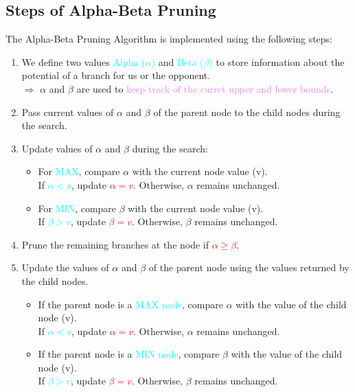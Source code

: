 \documentclass{book}
\begin{document}
\subsection{Steps of Alpha-Beta Pruning}
The Alpha-Beta Pruning Algorithm is implemented using the following steps:
\begin{enumerate}
    \item We define two values \textcolor{cyan}{Alpha ($\alpha$)} and \textcolor{cyan}{Beta ($\beta$)} to store information about the potential of a branch for us or the opponent.\\
    $\Rightarrow$ $\alpha$ and $\beta$ are used to \textcolor{violet}{keep track of the curret upper and lower bounds}.
    \item Pass current values of $\alpha$ and $\beta$ of the parent node to the child nodes during the search.
    \item Update values of $\alpha$ and $\beta$ during the search:
    \begin{itemize}
        \item For \textcolor{cyan}{MAX}, compare $\alpha$ with the current node value (v).\\
        If \textcolor{cyan}{$\alpha < v$}, update \textcolor{red}{$\alpha = v$}. Otherwise, $\alpha$ remains unchanged.
        \item For \textcolor{cyan}{MIN}, compare $\beta$ with the current node value (v).\\
        If \textcolor{cyan}{$\beta > v$}, update \textcolor{red}{$\beta = v$}. Otherwise, $\beta$ remains unchanged.
    \end{itemize}
    \item Prune the remaining branches at the node if \textcolor{red}{$\alpha \geq \beta$}.
    \item Update the values of $\alpha$ and $\beta$ of the parent node using the values returned by the child nodes.
    \begin{itemize}
        \item If the parent node is a \textcolor{cyan}{MAX node}, compare $\alpha$ with the value of the child node (v).\\
        If \textcolor{cyan}{$\alpha < v$}, update \textcolor{red}{$\alpha = v$}. Otherwise, $\alpha$ remains unchanged.
        \item If the parent node is a \textcolor{cyan}{MIN node}, compare $\beta$ with the value of the child node (v).\\
        If \textcolor{cyan}{$\beta > v$}, update \textcolor{red}{$\beta = v$}. Otherwise, $\beta$ remains unchanged.
    \end{itemize}
\end{enumerate}
\end{document}
